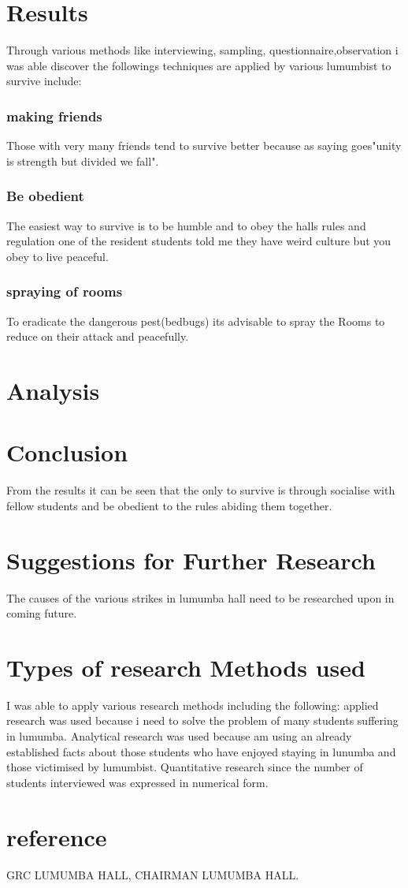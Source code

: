 \documentclass[10pt,A4paper]{article}
\begin{document}
\section{Results}
 Through various  methods like interviewing, sampling, questionnaire,observation i was able discover the followings techniques are applied by various lumumbist to survive include:
 \subsubsection{making friends}
 Those with very many friends tend to survive better because as saying goes"unity is strength but divided we fall".
 \subsubsection{Be obedient}
 The easiest way to survive is to be humble and to obey the halls rules and regulation one of the resident students told me they have weird culture but you obey to live peaceful.
 \subsubsection{spraying of rooms} 
 To eradicate the dangerous pest(bedbugs) its advisable to spray the Rooms to reduce on their attack and peacefully.
\section{Analysis}
 

\section{Conclusion}
From the results it can be seen that the only to survive is through socialise with fellow students and be obedient to the rules abiding them together.
\section{Suggestions for Further Research}
The causes of the various strikes in lumumba hall need to be researched upon in coming  future.
\section{Types of research  Methods  used}
I was able to apply various research methods including the following:
applied research was used because i need to solve the problem of many students suffering in lumumba.
Analytical research was used because am using an already established facts about those students who have enjoyed staying in lunumba and those victimised by lumumbist.
Quantitative research since the number of students interviewed was  expressed in numerical  form.
\section{reference}
GRC LUMUMBA HALL,
CHAIRMAN LUMUMBA HALL.
\end{document}

